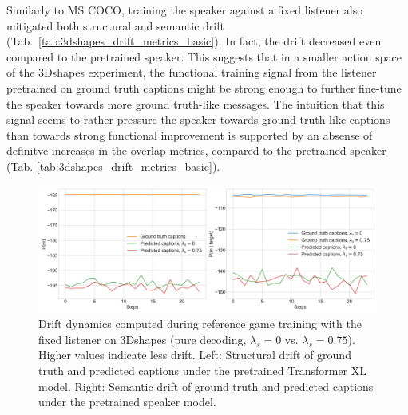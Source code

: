 Similarly to MS COCO, training the speaker against a fixed listener also mitigated both structural and semantic drift (Tab.~\ref{tab:3dshapes_drift_metrics_basic}). In fact, the drift decreased even compared to the pretrained speaker. This suggests that in a smaller action space of the 3Dshapes experiment, the functional training signal from the listener pretrained on ground truth captions might be strong enough to further fine-tune the speaker towards more ground truth-like messages. The intuition that this signal seems to rather pressure the speaker towards ground truth like captions than towards strong functional improvement is supported by an absense of definitve increases in the overlap metrics, compared to the pretrained speaker (Tab. \ref{tab:3dshapes_drift_metrics_basic}). 
\begin{figure}
	\centering
	\includegraphics[width=\linewidth]{images/3dshapes_fixedListener_structural_semantic_drift_49_pure_0_075_random.png}
	\caption{Drift dynamics computed during reference game training with the fixed listener on 3Dshapes (pure decoding, $\lambda_s=0$ vs. $\lambda_s=0.75$). Higher values indicate less drift. Left: Structural drift of ground truth and predicted captions under the pretrained Transformer XL model. Right: Semantic drift of ground truth and predicted captions under the pretrained speaker model.}
	\label{fig:3dshapes_fixed_listener_0_075_str_sem_drift}
\end{figure}


